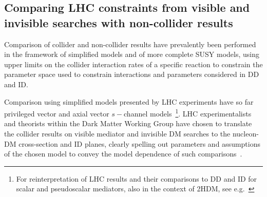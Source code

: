 \subsection{Comparing LHC constraints from visible and invisible searches with non-collider results}




Comparison of collider and non-collider results have prevalently been performed in the framework of simplified models and of more complete SUSY models, using upper limits on the collider interaction rates of a specific reaction to constrain the parameter space used to constrain interactions and parameters considered in DD and ID. 

Comparison using simplified models presented by LHC experiments have so far privileged vector and axial vector $s-$channel models~\footnote{For reinterpretation of LHC results and their comparisons to DD and ID for scalar and pseudoscalar mediators, also in the context of 2HDM, see e.g.~\cite{Athron:2017kgt,Banerjee:2017wxi,Ipek:2014gua,Bell:2016ekl}}.
LHC experimentalists and theorists within the Dark Matter Working Group have chosen to translate the collider results on visible mediator and invisible DM searches to the nucleon-DM cross-section and ID planes, clearly spelling out parameters and assumptions of the chosen model to convey the model dependence of such comparisons~\cite{Boveia:2016mrp}. 


